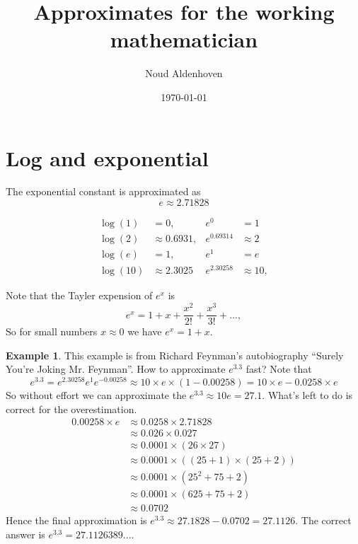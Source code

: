 \documentclass[10pt]{article}
\theoremstyle{definition}
\newtheorem{example}{Example}[section]
\begin{document}
\title{Approximates for the working mathematician}
\author{Noud Aldenhoven}
\date{\today}
\maketitle

\section{Log and exponential}

The exponential constant is approximated as
\begin{equation*}
    e \approx 2.71828
\end{equation*}

\begin{align*}
    \log(1) &= 0,               & e^0 &= 1 \\
    \log(2) &\approx 0.6931,    & e^{0.69314} &\approx 2 \\
    \log(e) &= 1,               & e^{1} &= e \\
    \log(10) &\approx 2.3025    & e^{2.30258} &\approx 10,
\end{align*}

Note that the Tayler expension of $e^x$ is
\begin{equation*}
    e^x = 1 + x + \frac{x^2}{2!} + \frac{x^3}{3!} + ...,
\end{equation*}
So for small numbers $x \approx 0$ we have $e^x = 1 + x$.

\begin{example}
    This example is from Richard Feynman's autobiography ``Surely You're Joking Mr. Feynman''.
    How to approximate $e^{3.3}$ fast?
    Note that
    \begin{equation*}
        e^{3.3} = e^{2.30258} e^{1} e^{-0.00258}
            \approx 10 \times e \times (1 - 0.00258)
            = 10 \times e - 0.0258 \times e
    \end{equation*}
    So without effort we can approximate the $e^{3.3} \approx 10 e = 27.1$.
    What's left to do is correct for the overestimation.
    \begin{equation*}
        \begin{split}
            0.00258 \times e
                &\approx 0.0258 \times 2.71828 \\
                &\approx 0.026 \times 0.027 \\
                &\approx 0.0001 \times (26 \times 27) \\
                &\approx 0.0001 \times ((25 + 1) \times (25 + 2)) \\
                &\approx 0.0001 \times (25^2 + 75 + 2) \\
                &\approx 0.0001 \times (625 + 75 + 2) \\
                &\approx 0.0702
        \end{split}
    \end{equation*}
    Hence the final approximation is $e^{3.3} \approx 27.1828 - 0.0702 = 27.1126$.
    The correct answer is $e^{3.3} = 27.1126389...$.
\end{example}
\end{document}
